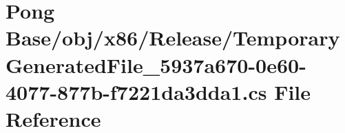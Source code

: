 \hypertarget{_release_2_temporary_generated_file__5937a670-0e60-4077-877b-f7221da3dda1_8cs}{\section{Pong Base/obj/x86/\-Release/\-Temporary\-Generated\-File\-\_\-5937a670-\/0e60-\/4077-\/877b-\/f7221da3dda1.cs File Reference}
\label{_release_2_temporary_generated_file__5937a670-0e60-4077-877b-f7221da3dda1_8cs}
}
